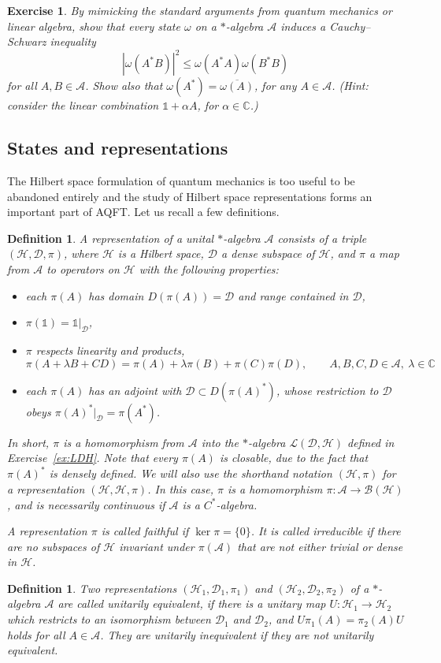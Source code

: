 \documentclass[12pt,a4paper]{article}
\newcommand{\1}{\mathds{1}}                         %
\newcommand{\CC}{\mathbb{C}}           %
\newcommand{\Hcal}{\mathcal {H}}
\newcommand{\Lcal}{\mathcal {L}}
\newcommand{\Bcal}{\mathcal {B}}
\newcommand{\HH}{{\mathcal{H}}}
\newcommand{\DD}{{\mathscr{D}}}
\newcommand{\II}{{\mathbb{1}}}
\newcommand{\Ac}{{\mathcal{A}}}
\newtheorem{exercise}[theorem]{Exercise}
\newtheorem{df}[theorem]{Definition}}
\begin{document}
\begin{exercise}
	By mimicking the standard arguments from quantum mechanics or linear algebra, show that every state $\omega$ on a $*$-algebra $\Ac$ induces a Cauchy--Schwarz inequality
	\begin{equation}\label{eq:CauchySchwarz}
	|\omega(A^*B)|^2\le \omega(A^*A)\omega(B^*B)
	\end{equation}
	for all $A,B\in\Ac$. Show also that $\omega(A^*)=\overline{\omega(A)}$, for any $A\in\Ac$. (Hint: consider the linear combination $\II+\alpha A$, for $\alpha\in\CC$.)
\end{exercise}



\subsection{States and representations}\label{sec:GNS}
The Hilbert space formulation of quantum mechanics is too useful to be abandoned entirely and the study of Hilbert space representations forms an important part of AQFT. Let us recall a few definitions. 
\begin{df}
	A \emph{representation} of a unital $*$-algebra $\Ac$ consists of
	a triple $(\HH,\DD,\pi)$, where $\HH$ is a Hilbert space, $\DD$ a dense subspace of $\HH$, and $\pi$ a map from $\Ac$ to operators on $\HH$ with the following properties: 
	\begin{itemize}
	    \item each $\pi(A)$ has domain $D(\pi(A))=\DD$ and range contained in $\DD$, 
	    \item $\pi(\II)=\II|_\DD$,
	    \item $\pi$ respects linearity and products,
	    \[
	    \pi(A+\lambda B+CD) = \pi(A) + \lambda\pi(B) + \pi(C)\pi(D), \qquad A,B,C,D\in\Ac,~\lambda\in\CC
	    \]
	    \item each $\pi(A)$ has an adjoint with $\DD\subset D(\pi(A)^*)$,  whose restriction to $\DD$ obeys $\pi(A)^*|_\DD=\pi(A^*)$.
	\end{itemize}
	In short, $\pi$ is a homomorphism  
	from $\Ac$ into the $*$-algebra $\Lcal(\DD,\HH)$ defined in  Exercise~\ref{ex:LDH}. Note that every $\pi(A)$ is closable, due to the fact that $\pi(A)^*$ is densely defined. We will also use the shorthand notation $(\HH,\pi)$ for a representation $(\HH,\HH,\pi)$. In this case, 
	$\pi$ is a homomorphism	$\pi:\Ac\rightarrow\Bcal(\Hcal)$, and is necessarily continuous if $\Ac$ is a $C^*$-algebra.
	
	\noindent A representation $\pi$ is called \emph{faithful} if $\ker \pi=\{0\}$. It is called irreducible if there are no subspaces of $\Hcal$ invariant under $\pi(\Ac)$ that are not either trivial or dense in $\Hcal$.
\end{df} 
\begin{df}
	Two representations $(\HH_1,\DD_1,\pi_1)$ and $(\HH_2,\DD_2,\pi_2)$ of a $*$-algebra $\Ac$ are called \emph{unitarily equivalent}, if
	there is a unitary map $U:\HH_1\rightarrow\HH_2$ which 
	restricts to an isomorphism between $\DD_1$ and $\DD_2$, and 
	$U\pi_1(A)=\pi_2(A) U$ holds for all $A\in\Ac$. They are \emph{unitarily inequivalent} if they are not unitarily equivalent.
\end{df} 
\end{document}
